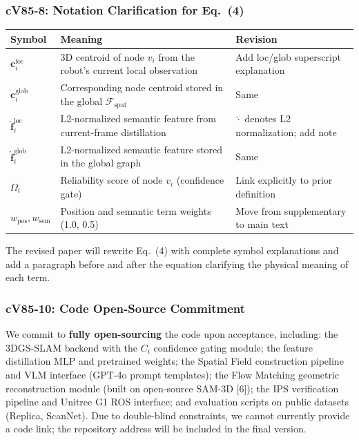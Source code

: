 \documentclass[10pt,a4paper]{article}
\begin{document}
\subsubsection*{cV85-8: Notation Clarification for Eq.~(4)}

\begin{table}[h]
\centering\small
\begin{tabular}{L{2.2cm}L{5.5cm}L{3.8cm}}
\toprule
\textbf{Symbol} & \textbf{Meaning} & \textbf{Revision}\\
\midrule
$\mathbf{c}_i^{\text{loc}}$ & 3D centroid of node $v_i$ from the robot's current local observation & Add loc/glob superscript explanation\\
$\mathbf{c}_i^{\text{glob}}$ & Corresponding node centroid stored in the global $\mathcal{F}_{\text{spat}}$ & Same\\
$\hat{\mathbf{f}}_i^{\text{loc}}$ & L2-normalized semantic feature from current-frame distillation & $\hat{\cdot}$ denotes L2 normalization; add note\\
$\hat{\mathbf{f}}_i^{\text{glob}}$ & L2-normalized semantic feature stored in the global graph & Same\\
$\Omega_i$ & Reliability score of node $v_i$ (confidence gate) & Link explicitly to prior definition\\
$w_{\text{pos}},w_{\text{sem}}$ & Position and semantic term weights (1.0, 0.5) & Move from supplementary to main text\\
\bottomrule
\end{tabular}
\end{table}
The revised paper will rewrite Eq.~(4) with complete symbol explanations and add a paragraph before and after the equation clarifying the physical meaning of each term.

\subsubsection*{cV85-10: Code Open-Source Commitment}

We commit to \textbf{fully open-sourcing} the code upon acceptance, including: the 3DGS-SLAM backend with the $C_i$ confidence gating module; the feature distillation MLP and pretrained weights; the Spatial Field construction pipeline and VLM interface (GPT-4o prompt templates); the Flow Matching geometric reconstruction module (built on open-source SAM-3D [6]); the IPS verification pipeline and Unitree G1 ROS interface; and evaluation scripts on public datasets (Replica, ScanNet). Due to double-blind constraints, we cannot currently provide a code link; the repository address will be included in the final version.
\end{document}
